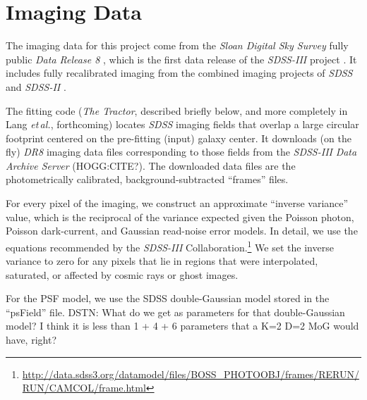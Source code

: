 \documentclass[12pt,preprint,pdftex]{aastex}
\newcommand{\project}[1]{\textsl{#1}}
\newcommand{\foreign}[1]{\emph{#1}}
\newcommand{\etal}{\foreign{et\,al.}}
\begin{document}
\section{Imaging Data}\label{sec:data}
The imaging data for this project come from the \project{Sloan Digital
  Sky Survey} fully public \project{Data Release 8} \citep{dr8}, which is
the first data release of the \project{SDSS-III} project \citep{sdssiii}.  It
includes fully recalibrated imaging \citep{padmanabhan} from the
combined imaging projects of \project{SDSS} \citep{york}  and
\project{SDSS-II} \citep{sdssii}.

The fitting code (\project{The Tractor}, described briefly below, and
more completely in Lang \etal, forthcoming) locates \project{SDSS}
imaging fields that overlap a large circular footprint centered on the
pre-fitting (input) galaxy center.  It downloads (on the fly)
\project{DR8} imaging data files corresponding to those fields from
the \project{SDSS-III} \project{Data Archive Server} (HOGG:CITE?).  The
downloaded data files are the photometrically calibrated,
background-subtracted ``frames'' files.

For every pixel of the imaging, we construct an approximate ``inverse
variance'' value, which is the reciprocal of the variance expected
given the Poisson photon, Poisson dark-current, and Gaussian
read-noise error models.  In detail, we use the equations recommended
by the \project{SDSS-III}
Collaboration.\footnote{\url{http://data.sdss3.org/datamodel/files/BOSS\_PHOTOOBJ/frames/RERUN/RUN/CAMCOL/frame.html}}
We set the inverse variance to zero for any pixels that lie in regions
that were interpolated, saturated, or affected by cosmic rays or ghost
images.

For the PSF model, we use the SDSS double-Gaussian model stored in the
``psField'' file.  DSTN: What do we get as parameters for that
double-Gaussian model?  I think it is less than 1 + 4 + 6 parameters
that a K=2 D=2 MoG would have, right?
\end{document}
